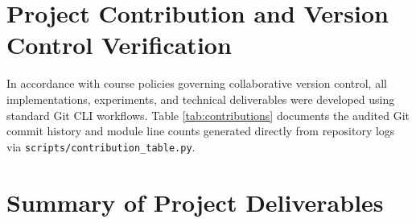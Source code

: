 \documentclass[11pt,a4paper]{article}
\begin{document}
\FloatBarrier
\newpage

\section{Project Contribution and Version Control Verification}

In accordance with course policies governing collaborative version control, all implementations, experiments, and technical deliverables were developed using standard Git CLI workflows. Table \ref{tab:contributions} documents the audited Git commit history and module line counts generated directly from repository logs via \texttt{scripts/contribution\_table.py}.



\section{Summary of Project Deliverables}
\end{document}
